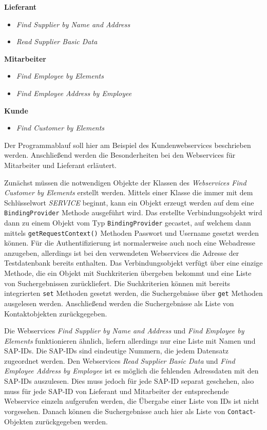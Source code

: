 \textbf{Lieferant}
\begin{itemize}
\item \emph{Find Supplier by Name and Address}
\item \emph{Read Supplier Basic Data}
\end{itemize}

\textbf{Mitarbeiter}
\begin{itemize}
\item \emph{Find Employee by Elements}
\item \emph{Find Employee Address by Employee}
\end{itemize}

\textbf{Kunde}
\begin{itemize}
\item \emph{Find Customer by Elements}
\end{itemize}

Der Programmablauf soll hier am Beispiel des Kundenwebservices beschrieben werden. Anschließend werden die Besonderheiten
bei den Webservices für Mitarbeiter und Lieferant erläutert.

Zunächst müssen die notwendigen Objekte der Klassen des \emph{Webservices Find Customer by Elements} erstellt werden. Mittels
einer Klasse die immer mit dem Schlüsselwort \emph{SERVICE} beginnt, kann ein Objekt erzeugt werden auf dem eine  \lstinline{BindingProvider} Methode
ausgeführt wird. Das erstellte Verbindungsobjekt wird dann zu einem Objekt vom Typ  \lstinline{BindingProvider} gecastet, auf welchem dann
mittels \lstinline{getRequestContext()} Methoden Passwort und Username gesetzt werden können. Für die Authentifizierung ist normalerweise
auch noch eine Webadresse anzugeben, allerdings ist bei den verwendeten Webservices die Adresse der Testdatenbank bereits 
enthalten. Das Verbindungsobjekt verfügt über eine einzige Methode, die ein Objekt mit Suchkriterien übergeben bekommt 
und eine Liste von Suchergebnissen zurückliefert. Die Suchkriterien können mit bereits integrierten  \lstinline{set} Methoden gesetzt werden,
die Suchergebnisse über \lstinline{get} Methoden ausgelesen werden. Anschließend werden die Suchergebnisse als Liste von Kontaktobjekten
zurückgegeben.

Die Webservices \emph{Find Supplier by Name and Address} und \emph{Find Employee by Elements} funktionieren ähnlich, liefern allerdings nur 
eine Liste mit Namen und SAP-IDs. Die SAP-IDs sind eindeutige Nummern, die jedem Datensatz zugeordnet werden. Den Webservices
\emph{Read Supplier Basic Data} und \emph{Find Employee Address by Employee} ist es möglich die fehlenden Adressdaten mit den SAP-IDs 
auszulesen. Dies muss jedoch für jede SAP-ID separat geschehen, also muss für jede SAP-ID von Lieferant und Mitarbeiter der
entsprechende Webservice einzeln aufgerufen werden, die Übergabe einer Liste von IDs ist nicht vorgesehen. Danach können 
die Suchergebnisse auch hier als Liste von \lstinline{Contact}-Objekten zurückgegeben werden.


